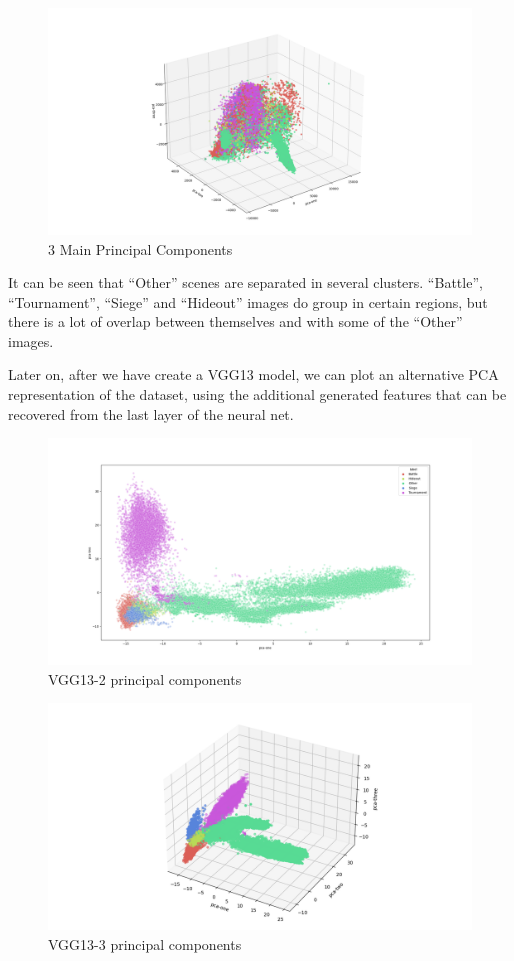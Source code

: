 \documentclass[
]{article}
\begin{document}
\begin{figure}[H]
	\centering
	\includegraphics{visualizations/pca_sklearn_3d_80_45_L.png}
	\caption{3 Main Principal Components}
\end{figure}


It can be seen that ``Other'' scenes are separated in several clusters.
``Battle'', ``Tournament'', ``Siege'' and ``Hideout'' images do group in
certain regions, but there is a lot of overlap between themselves and
with some of the ``Other'' images.

Later on, after we have create a VGG13 model, we can plot an alternative PCA representation of the
dataset, using the additional generated features that can be recovered from the last layer of the neural net.

\begin{figure}[H]
\centering
\includegraphics{visualizations/pca_v5n_2d_f.png}
\caption{VGG13-2 principal components}
\end{figure}

\begin{figure}[H]
\centering
\includegraphics{visualizations/pca_v5n_3d_f4.png}
\caption{VGG13-3 principal components}
\end{figure}
\end{document}
